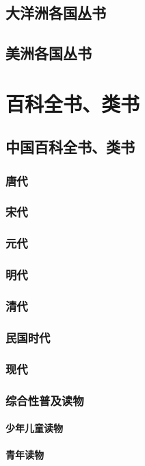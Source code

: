 \documentclass[UTF8]{../ApplicationUniverse}
\begin{document}
\section{大洋洲各国丛书}
\section{美洲各国丛书}






\chapter{百科全书、类书}
\section{中国百科全书、类书}
    \subsection{唐代}
    \subsection{宋代}
    \subsection{元代}
    \subsection{明代}
    \subsection{清代}
    \subsection{民国时代}
    \subsection{现代}
    \subsection{综合性普及读物}
        \subsubsection{少年儿童读物}
        \subsubsection{青年读物}
\end{document}
